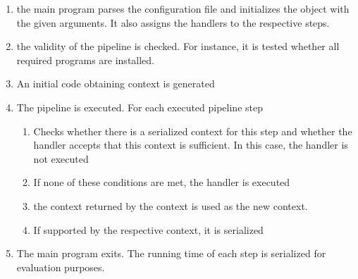 \begin{enumerate}
    \item the main program parses the configuration file and initializes the object with the given arguments. It also assigns the handlers to the respective steps.
    \item  the validity of the pipeline is checked. For instance, it is tested whether all required programs are installed.
    \item An initial code obtaining context is generated
    \item The pipeline is executed. For each executed pipeline step
    \begin{enumerate}
        \item Checks whether there is a serialized context for this step and whether the handler accepts that this context is sufficient. In this case, the handler is not executed
        \item If none of these conditions are met, the handler is executed
        \item the context returned by the context is used as the new context.
        \item If supported by the respective context, it is serialized
    \end{enumerate}
    \item The main program exits. The running time of each step is serialized for evaluation purposes. 
\end{enumerate}
